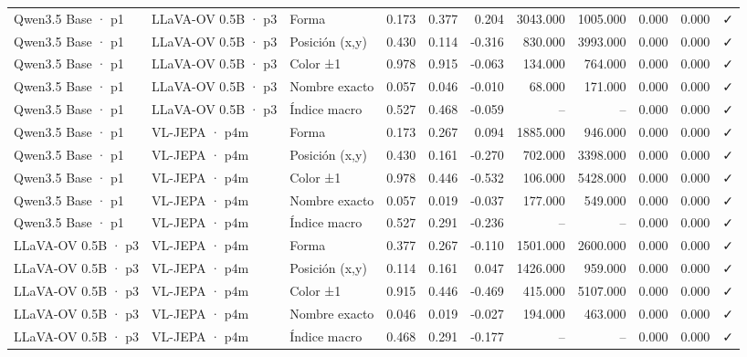 \begin{tabular}{lllrrrrrrrl}
Qwen3.5 Base · p1 & LLaVA-OV 0.5B · p3 & Forma & 0.173 & 0.377 & 0.204 & 3043.000 & 1005.000 & 0.000 & 0.000 & ✓ \\
Qwen3.5 Base · p1 & LLaVA-OV 0.5B · p3 & Posición (x,y) & 0.430 & 0.114 & -0.316 & 830.000 & 3993.000 & 0.000 & 0.000 & ✓ \\
Qwen3.5 Base · p1 & LLaVA-OV 0.5B · p3 & Color ±1 & 0.978 & 0.915 & -0.063 & 134.000 & 764.000 & 0.000 & 0.000 & ✓ \\
Qwen3.5 Base · p1 & LLaVA-OV 0.5B · p3 & Nombre exacto & 0.057 & 0.046 & -0.010 & 68.000 & 171.000 & 0.000 & 0.000 & ✓ \\
Qwen3.5 Base · p1 & LLaVA-OV 0.5B · p3 & Índice macro & 0.527 & 0.468 & -0.059 & -- & -- & 0.000 & 0.000 & ✓ \\
Qwen3.5 Base · p1 & VL-JEPA · p4m & Forma & 0.173 & 0.267 & 0.094 & 1885.000 & 946.000 & 0.000 & 0.000 & ✓ \\
Qwen3.5 Base · p1 & VL-JEPA · p4m & Posición (x,y) & 0.430 & 0.161 & -0.270 & 702.000 & 3398.000 & 0.000 & 0.000 & ✓ \\
Qwen3.5 Base · p1 & VL-JEPA · p4m & Color ±1 & 0.978 & 0.446 & -0.532 & 106.000 & 5428.000 & 0.000 & 0.000 & ✓ \\
Qwen3.5 Base · p1 & VL-JEPA · p4m & Nombre exacto & 0.057 & 0.019 & -0.037 & 177.000 & 549.000 & 0.000 & 0.000 & ✓ \\
Qwen3.5 Base · p1 & VL-JEPA · p4m & Índice macro & 0.527 & 0.291 & -0.236 & -- & -- & 0.000 & 0.000 & ✓ \\
LLaVA-OV 0.5B · p3 & VL-JEPA · p4m & Forma & 0.377 & 0.267 & -0.110 & 1501.000 & 2600.000 & 0.000 & 0.000 & ✓ \\
LLaVA-OV 0.5B · p3 & VL-JEPA · p4m & Posición (x,y) & 0.114 & 0.161 & 0.047 & 1426.000 & 959.000 & 0.000 & 0.000 & ✓ \\
LLaVA-OV 0.5B · p3 & VL-JEPA · p4m & Color ±1 & 0.915 & 0.446 & -0.469 & 415.000 & 5107.000 & 0.000 & 0.000 & ✓ \\
LLaVA-OV 0.5B · p3 & VL-JEPA · p4m & Nombre exacto & 0.046 & 0.019 & -0.027 & 194.000 & 463.000 & 0.000 & 0.000 & ✓ \\
LLaVA-OV 0.5B · p3 & VL-JEPA · p4m & Índice macro & 0.468 & 0.291 & -0.177 & -- & -- & 0.000 & 0.000 & ✓ \\
\bottomrule
\end{tabular}

